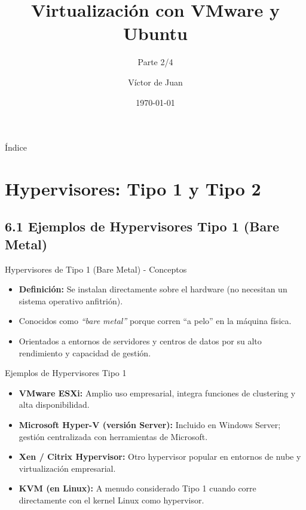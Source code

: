 \documentclass{beamer}
\title{Virtualización con VMware y Ubuntu}
\subtitle{Parte 2/4}
\author{Víctor de Juan}
\date{\today}
\begin{document}
\begin{frame}
    \titlepage
\end{frame}

\begin{frame}{Índice}
    \tableofcontents[
    hideallsubsections]
\end{frame}

\section{Hypervisores: Tipo 1 y Tipo 2}

\subsection{6.1 Ejemplos de Hypervisores Tipo 1 (Bare Metal)}
\begin{frame}{Hypervisores de Tipo 1 (Bare Metal) - Conceptos}
    \begin{itemize}
        \item \textbf{Definición:} Se instalan directamente sobre el hardware (no necesitan un sistema operativo anfitrión).
        \item Conocidos como \textit{“bare metal”} porque corren “a pelo” en la máquina física.
        \item Orientados a entornos de servidores y centros de datos por su alto rendimiento y capacidad de gestión.
    \end{itemize}
\end{frame}

\begin{frame}{Ejemplos de Hypervisores Tipo 1}
    \begin{itemize}
        \item \textbf{VMware ESXi:} Amplio uso empresarial, integra funciones de clustering y alta disponibilidad.
        \item \textbf{Microsoft Hyper-V (versión Server):} Incluido en Windows Server; gestión centralizada con herramientas de Microsoft.
        \item \textbf{Xen / Citrix Hypervisor:} Otro hypervisor popular en entornos de nube y virtualización empresarial.
        \item \textbf{KVM (en Linux):} A menudo considerado Tipo 1 cuando corre directamente con el kernel Linux como hypervisor.
    \end{itemize}
\end{frame}
\end{document}
